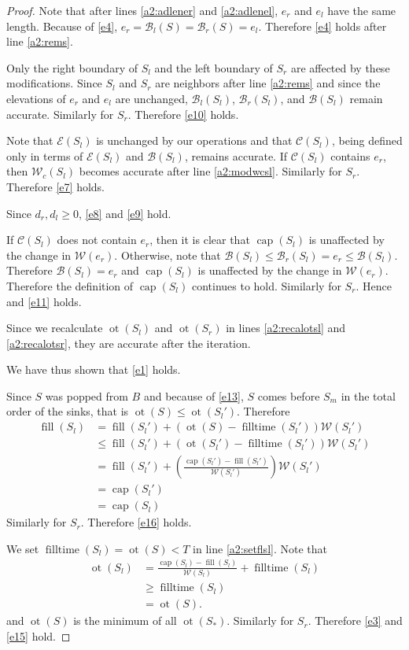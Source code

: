 \documentclass[11pt,a4paper]{article}
\newcommand{\Br}{\mathcal{B}_r}
\newcommand{\Bl}{\mathcal{B}_l}
\newcommand{\B}{\mathcal{B}}
\newcommand{\Wc}{\mathcal{W}_c}
\newcommand{\W}{\mathcal{W}}
\newcommand{\C}{\mathcal{C}}
\newcommand{\E}{\mathcal{E}}
\DeclareMathOperator{\capp}{cap}
\DeclareMathOperator{\ot}{ot}
\DeclareMathOperator{\Fill}{fill}
\DeclareMathOperator{\filltime}{filltime}
\begin{document}
\begin{proof}
Note that after lines \ref{a2:adlener} and \ref{a2:adlenel}, $e_r$ and $e_l$ have the same length.
Because of \ref{e4}, $e_r = \Bl(S) = \Br(S) = e_l$.
Therefore \ref{e4} holds after line \ref{a2:rems}.

Only the right boundary of $S_l$ and the left boundary of $S_r$ are affected by these modifications.
Since $S_l$ and $S_r$ are neighbors after line \ref{a2:rems} and since the elevations of $e_r$ and $e_l$ are unchanged, $\Bl(S_l)$, $\Br(S_l)$, and $\B(S_l)$ remain accurate.
Similarly for $S_r$.
Therefore \ref{e10} holds.

Note that $\E(S_l)$ is unchanged by our operations and that $\C(S_l)$, being defined only in terms of $\E(S_l)$ and $\B(S_l)$, remains accurate.
If $\C(S_l)$ contains $e_r$, then $\Wc(S_l)$ becomes accurate after line \ref{a2:modwcsl}.
Similarly for $S_r$.
Therefore \ref{e7} holds.

Since $d_r, d_l \ge 0$, \ref{e8} and \ref{e9} hold.

If $\C(S_l)$ does not contain $e_r$, then it is clear that $\capp(S_l)$ is unaffected by the change in $\W(e_r)$.
Otherwise, note that $\B(S_l) \le \Br(S_l) = e_r \le \B(S_l)$.
Therefore $\B(S_l) = e_r$ and $\capp(S_l)$ is unaffected by the change in $\W(e_r)$.
Therefore the definition of $\capp(S_l)$ continues to hold.
Similarly for $S_r$.
Hence and \ref{e11} holds.

Since we recalculate $\ot(S_l)$ and $\ot(S_r)$ in lines \ref{a2:recalotsl} and \ref{a2:recalotsr}, they are accurate after the iteration.

We have thus shown that \ref{e1} holds.

Since $S$ was popped from $B$ and because of \ref{e13}, $S$ comes before $S_m$ in the total order of the sinks, that is $\ot(S)\le\ot(S_l')$.
Therefore
\begin{align*}
    \Fill(S_l) &= \Fill(S_l') + (\ot(S)-\filltime(S_l'))\W(S_l') \\
               &\le \Fill(S_l') + (\ot(S_l')-\filltime(S_l'))\W(S_l') \\
               &= \Fill(S_l') + \left(\frac{\capp(S_l') - \Fill(S_l')}{\W(S_l')}\right)\W(S_l') \\
               &= \capp(S_l') \\
               &= \capp(S_l)
\end{align*}
Similarly for $S_r$.
Therefore \ref{e16} holds.

We set $\filltime(S_l) = \ot(S) < T$ in line \ref{a2:setflsl}.
Note that
\begin{align*}
    \ot(S_l) &= \frac{\capp(S_l) - \Fill(S_l)}{\W(S_l)} + \filltime(S_l) \\
             &\ge \filltime(S_l) \\
             &= \ot(S).
\end{align*}
and $\ot(S)$ is the minimum of all $\ot(S_*)$.
Similarly for $S_r$.
Therefore \ref{e3} and \ref{e15} hold.


\end{proof}
\end{document}
